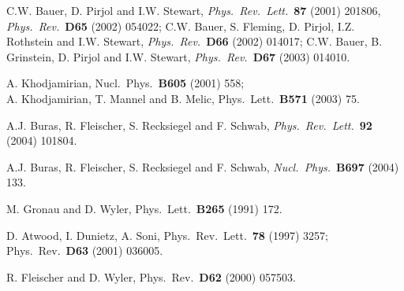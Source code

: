 \documentclass[12pt]{article}
\begin{document}
\begin{thebibliography}{999}
C.W. Bauer, D. Pirjol and I.W. Stewart,
{\it Phys.\ Rev.\ Lett.}~{\bf 87} (2001) 201806,
{\it Phys.\ Rev.}~{\bf D65} (2002) 054022;
C.W. Bauer, S. Fleming, D. Pirjol, I.Z. Rothstein and I.W. Stewart,
{\it Phys.\ Rev.}~{\bf D66} (2002) 014017;
C.W. Bauer, B. Grinstein, D. Pirjol and I.W. Stewart,
{\it Phys.\ Rev.}~{\bf D67} (2003) 014010.

A. Khodjamirian,
{ Nucl.\ Phys.}~{\bf B605} (2001) 558;\\
A. Khodjamirian, T. Mannel and B. Melic,
{ Phys.\ Lett.}~{\bf B571} (2003) 75.


A.J. Buras, R. Fleischer, S. Recksiegel and F. Schwab,
{\it Phys.\ Rev.\ Lett.}~{\bf 92} (2004) 101804.

A.J. Buras, R. Fleischer, S. Recksiegel and F. Schwab,
  {\it Nucl.\ Phys.}~{\bf B697} (2004) 133.

M. Gronau and D. Wyler,
{ Phys.\ Lett.}~{\bf B265} (1991) 172.

D. Atwood, I. Dunietz, A. Soni,
{ Phys.\ Rev.\ Lett.}~{\bf 78} (1997) 3257;
{ Phys.\ Rev.}~{\bf D63} (2001) 036005.

R. Fleischer and D. Wyler,
{ Phys.\ Rev.}~{\bf D62} (2000) 057503.


\end{thebibliography}
\end{document}
